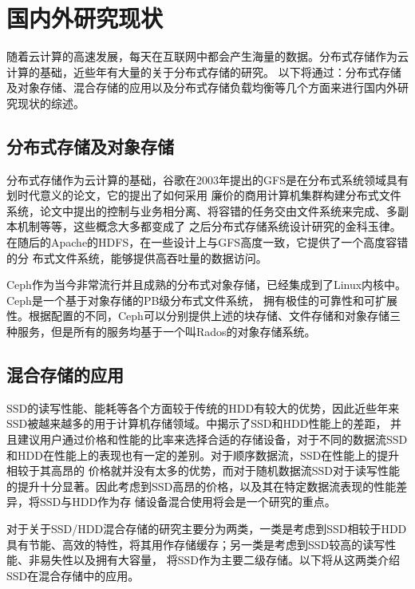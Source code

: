 
\chapter{国内外研究现状}
\label{chap:relatedwork}
随着云计算的高速发展，每天在互联网中都会产生海量的数据。分布式存储作为云计算的基础，近些年有大量的关于分布式存储的研究。
以下将通过：分布式存储及对象存储、混合存储的应用以及分布式存储负载均衡等几个方面来进行国内外研究现状的综述。

\section{分布式存储及对象存储}
分布式存储作为云计算的基础，谷歌在2003年提出的GFS\cite{ghemawat2003google}是在分布式系统领域具有划时代意义的论文，它的提出了如何采用
廉价的商用计算机集群构建分布式文件系统，论文中提出的控制与业务相分离、将容错的任务交由文件系统来完成、多副本机制等等，这些概念大多都变成了
之后分布式存储系统设计研究的金科玉律。在随后的Apache的HDFS\cite{shvachko2010hadoop}，在一些设计上与GFS高度一致，它提供了一个高度容错的分
布式文件系统，能够提供高吞吐量的数据访问。

Ceph\cite{weil2006ceph}作为当今非常流行并且成熟的分布式对象存储，已经集成到了Linux内核中。Ceph是一个基于对象存储的PB级分布式文件系统，
拥有极佳的可靠性和可扩展性。根据配置的不同，Ceph可以分别提供上述的块存储、文件存储和对象存储三种服务，但是所有的服务均基于一个叫Rados的对象存储系统。

\section{混合存储的应用}
SSD的读写性能、能耗等各个方面较于传统的HDD有较大的优势，因此近些年来SSD被越来越多的用于计算机存储领域。中揭示了SSD和HDD性能上的差距，
并且建议用户通过价格和性能的比率来选择合适的存储设备，对于不同的数据流SSD和HDD在性能上的表现也有一定的差别。对于顺序数据流，SSD在性能上的提升相较于其高昂的
价格就并没有太多的优势，而对于随机数据流SSD对于读写性能的提升十分显著。因此考虑到SSD高昂的价格，以及其在特定数据流表现的性能差异，将SSD与HDD作为存
储设备混合使用将会是一个研究的重点。

对于关于SSD/HDD混合存储的研究主要分为两类，一类是考虑到SSD相较于HDD具有节能、高效的特性，将其用作存储缓存；另一类是考虑到SSD较高的读写性能、非易失性以及拥有大容量，
将SSD作为主要二级存储。以下将从这两类介绍SSD在混合存储中的应用。

